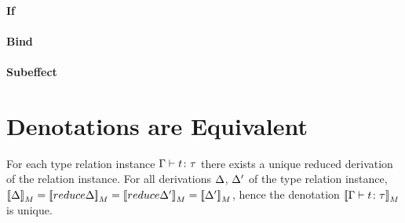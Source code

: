 \documentclass{report}
\begin{document}
            \paragraph{If}
            \paragraph{Bind}
            \paragraph{Subeffect}


    
    \section{Denotations are Equivalent}
    For each type relation instance $\Gamma \vdash t \colon \tau$ there exists a unique reduced derivation of the relation instance. For all derivations $\Delta$, $\Delta'$ of the type relation instance, $\deno{\D} = \deno{\reduce{\D}} = \deno{\reduce{\D'}} = \deno{\D'} $, hence the denotation ${\bf [\![}\Gamma \vdash t \colon \tau{\bf ]\!]}_M$ is unique.
\end{document}
